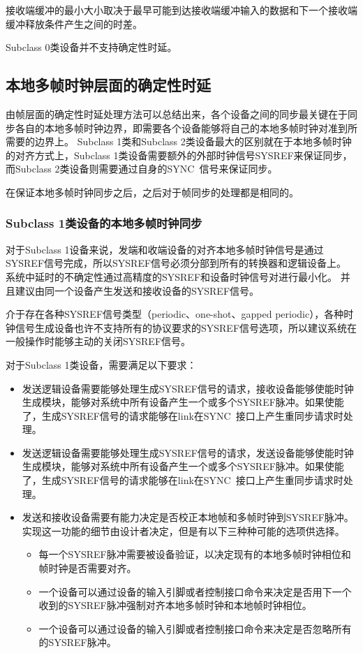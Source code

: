 \documentclass[UTF8]{ctexart}
\begin{document}
接收端缓冲的最小大小取决于最早可能到达接收端缓冲输入的数据和下一个接收端缓冲释放条件产生之间的时差。

Subclass 0类设备并不支持确定性时延。

\subsection{本地多帧时钟层面的确定性时延}

由帧层面的确定性时延处理方法可以总结出来，各个设备之间的同步最关键在于同步各自的本地多帧时钟边界，即需要各个设备能够将自己的本地多帧时钟对准到所需要的边界上。
Subclass 1类和Subclass 2类设备最大的区别就在于本地多帧时钟的对齐方式上，Subclass 1类设备需要额外的外部时钟信号SYSREF来保证同步，而Subclass 2类设备则需要通过自身的SYNC~信号来保证同步。

在保证本地多帧时钟同步之后，之后对于帧同步的处理都是相同的。

\subsubsection{Subclass 1类设备的本地多帧时钟同步}

对于Subclass 1设备来说，发端和收端设备的对齐本地多帧时钟信号是通过SYSREF信号完成，所以SYSREF信号必须分部到所有的转换器和逻辑设备上。
系统中延时的不确定性通过高精度的SYSREF和设备时钟信号对进行最小化。
并且建议由同一个设备产生发送和接收设备的SYSREF信号。

介于存在各种SYSREF信号类型（periodic、one-shot、gapped periodic），各种时钟信号生成设备也许不支持所有的协议要求的SYSREF信号选项，所以建议系统在一般操作时能够主动的关闭SYSREF信号。

对于Subclass 1类设备，需要满足以下要求：

\begin{itemize}
\item 发送逻辑设备需要能够处理生成SYSREF信号的请求，接收设备能够使能时钟生成模块，能够对系统中所有设备产生一个或多个SYSREF脉冲。如果使能了，生成SYSREF信号的请求能够在link在SYNC~接口上产生重同步请求时处理。
\item 发送逻辑设备需要能够处理生成SYSREF信号的请求，发送设备能够使能时钟生成模块，能够对系统中所有设备产生一个或多个SYSREF脉冲。如果使能了，生成SYSREF信号的请求能够在link在SYNC~接口上产生重同步请求时处理。
\item 发送和接收设备需要有能力决定是否校正本地帧和多帧时钟到SYSREF脉冲。实现这一功能的细节由设计者决定，但是有以下三种种可能的选项供选择。
	\begin{itemize}
	\item 每一个SYSREF脉冲需要被设备验证，以决定现有的本地多帧时钟相位和帧时钟是否需要对齐。
	\item 一个设备可以通过设备的输入引脚或者控制接口命令来决定是否用下一个收到的SYSREF脉冲强制对齐本地多帧时钟和本地帧时钟相位。
	\item 一个设备可以通过设备的输入引脚或者控制接口命令来决定是否忽略所有的SYSREF脉冲。
	\end{itemize}
\end{itemize}
\end{document}
